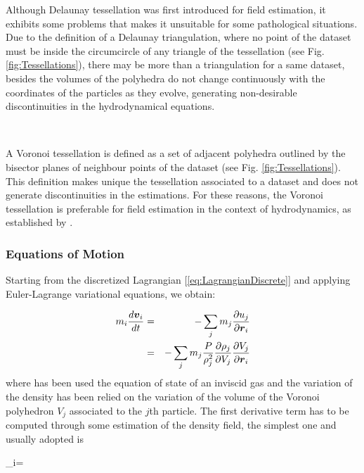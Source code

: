 \documentclass[a4,useAMS,usenatbib,usegraphicx,12pt]{article}
\begin{document}
Although Delaunay tessellation was first introduced for field estimation, it 
exhibits some problems that makes it unsuitable for some pathological 
situations. Due to the definition of a Delaunay triangulation, where no point 
of the dataset must be inside the circumcircle of any triangle of the 
tessellation (see Fig. \ref{fig:Tessellations}), there may be more than a 
triangulation for a same dataset, besides the volumes of the polyhedra do not 
change continuously with the coordinates of the particles as they evolve, 
generating non-desirable discontinuities in the hydrodynamical equations.

\

A Voronoi tessellation is defined as a set of adjacent polyhedra outlined by
the bisector planes of neighbour points of the dataset (see Fig. 
\ref{fig:Tessellations}). This definition makes unique the tessellation 
associated to a dataset and does not generate discontinuities in the 
estimations. For these reasons, the Voronoi tessellation is preferable for 
field estimation in the context of hydrodynamics, as established by 
\citet{Hess10}.


\subsubsection*{Equations of Motion}

Starting from the discretized Lagrangian [\ref{eq:LagrangianDiscrete}] and 
applying Euler-Lagrange variational equations, we obtain:

\begin{eqnarray}
\nonumber{}
m_i \frac{d \boldsymbol{ v }_i}{dt} &=& - \sum_j m_j \frac{\partial u_j}{\partial \boldsymbol{ r }_i} \\
\label{eq:VPHLarangian}
&=& -\sum_j m_j \frac{P}{\rho_j^2}\frac{\partial \rho_j}{\partial V_j}\frac{\partial V_j}{\partial \boldsymbol{ r }_i}
\end{eqnarray}
where has been used the equation of state of an inviscid gas and the variation
of the density has been relied on the variation of the volume of the Voronoi 
polyhedron $V_j$ associated to the $j$th particle. The first derivative term has 
to be computed through some estimation of the density field, the simplest one and 
usually adopted is 

{ \rho_i=  }
\end{document}
